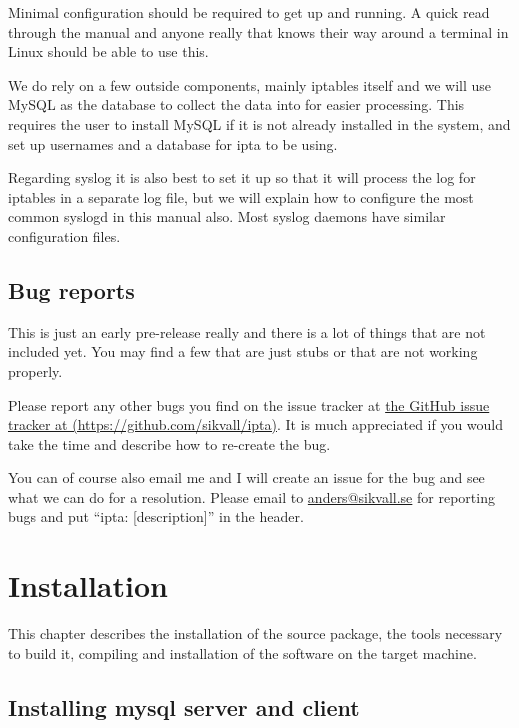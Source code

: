 \documentclass[english,twoside,openright,a4paper,12pt]{article}
\begin{document}
Minimal configuration should be required to get up and running. A quick read through the manual and anyone really that knows their way around a terminal in Linux should be able to use this.

We do rely on a few outside components, mainly iptables itself and we will use MySQL as the database to collect the data into for easier processing. This requires the user to install MySQL if it is not already installed in the system, and set up usernames and a database for ipta to be using.

Regarding syslog it is also best to set it up so that it will process the log for iptables in a separate log file, but we will explain how to configure the most common syslogd in this manual also. Most syslog daemons have similar configuration files.

\subsection{Bug reports}

This is just an early pre-release really and there is a lot of things that are not included yet. You may find a few that are just stubs or that are not working properly.

Please report any other bugs you find on the issue tracker at \hyperref[https://github.com/sikvall/ipta]{the GitHub issue tracker at  (https://github.com/sikvall/ipta)}. It is much appreciated if you would take the time and describe how to re-create the bug.

You can of course also email me and I will create an issue for the bug and see what we can do for a resolution. Please email to \hyperref[mailto:anders@sikvall.se]{anders@sikvall.se} for reporting bugs and put ``ipta: [description]'' in the header.
 

\section{Installation}

This chapter describes the installation of the source package, the tools necessary to build it, compiling and installation of the software on the target machine.

\subsection{Installing mysql server and client}
\end{document}
